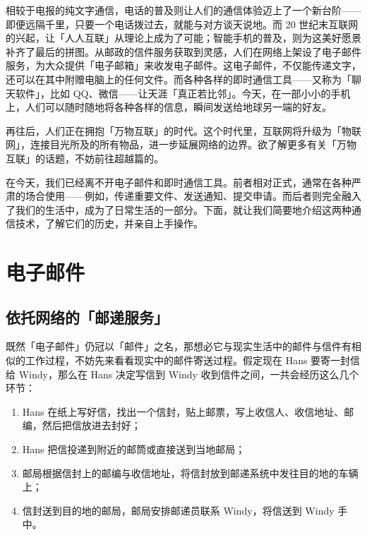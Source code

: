 相较于电报的纯文字通信，电话的普及则让人们的通信体验迈上了一个新台阶——即便远隔千里，只要一个电话拨过去，就能与对方谈天说地。而 20 世纪末互联网的兴起，让「人人互联」从理论上成为了可能；智能手机的普及，则为这美好愿景补齐了最后的拼图。从邮政的信件服务获取到灵感，人们在网络上架设了电子邮件服务，为大众提供「电子邮箱」来收发电子邮件。这电子邮件，不仅能传递文字，还可以在其中附赠电脑上的任何文件。而各种各样的即时通信工具——又称为「聊天软件」，比如 QQ、微信——让天涯「真正若比邻」。今天，在一部小小的手机上，人们可以随时随地将各种各样的信息，瞬间发送给地球另一端的好友。

\begin{note}
  再往后，人们正在拥抱「万物互联」的时代。这个时代里，互联网将升级为「物联网」，连接目光所及的所有物品，进一步延展网络的边界。欲了解更多有关「万物互联」的话题，不妨前往超越篇的。
\end{note}

在今天，我们已经离不开电子邮件和即时通信工具。前者相对正式，通常在各种严肃的场合使用——例如，传递重要文件、发送通知、提交申请。而后者则完全融入了我们的生活中，成为了日常生活的一部分。下面，就让我们简要地介绍这两种通信技术，了解它们的历史，并亲自上手操作。

\section{电子邮件}

\subsection{依托网络的「邮递服务」}

既然「电子邮件」仍冠以「邮件」之名，那想必它与现实生活中的邮件与信件有相似的工作过程，不妨先来看看现实中的邮件寄送过程。假定现在 Hans 要寄一封信给 Windy，那么在 Hans 决定写信到 Windy 收到信件之间，一共会经历这么几个环节：

\begin{enumerate}
  \item Hans 在纸上写好信，找出一个信封，贴上邮票，写上收信人、收信地址、邮编，然后把信放进去封好；
  \item Hans 把信投递到附近的邮筒或直接送到当地邮局；
  \item 邮局根据信封上的邮编与收信地址，将信封放到邮递系统中发往目的地的车辆上；
  \item 信封送到目的地的邮局，邮局安排邮递员联系 Windy，将信送到 Windy 手中。
\end{enumerate}

